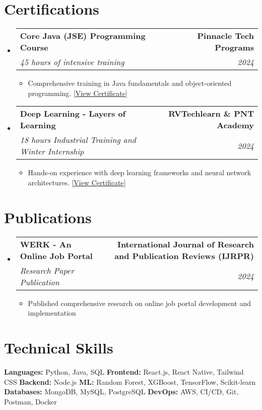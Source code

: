 \documentclass[letterpaper,11pt]{article}
\makeatletter
\newcommand{\resumeItem}[1]{
  \item\small{
    {#1 \vspace{-2pt}}
  }
}
\newcommand{\resumeSubheading}[4]{
  \vspace{-2pt}\item
  \begin{tabular*}{1.0\textwidth}[t]{l@{\extracolsep{\fill}}r}
    \textbf{#1} & \textbf{\small #2} \\
    \textit{\small#3} & \textit{\small #4} \\
  \end{tabular*}\vspace{-7pt}
}
\newcommand{\resumeSubHeadingListStart}{\begin{itemize}[leftmargin=0.0in, label={}]}
\newcommand{\resumeSubHeadingListEnd}{\end{itemize}}
\newcommand{\resumeItemListStart}{\begin{itemize}}
\newcommand{\resumeItemListEnd}{\end{itemize}\vspace{-5pt}}
\makeatother
\begin{document}
\section{Certifications}
\resumeSubHeadingListStart
  \resumeSubheading
    {Core Java (JSE) Programming Course}{Pinnacle Tech Programs}
    {45 hours of intensive training}{2024}
    \resumeItemListStart
      \resumeItem{Comprehensive training in Java fundamentals and object-oriented programming. [\href{https://drive.google.com/file/d/1Lf2cOTG3Nwv9vOYOVXjcn3a3jWpDPUBj/view?usp=sharing}{\color{blue}View Certificate}]}
    \resumeItemListEnd

  \resumeSubheading
    {Deep Learning - Layers of Learning}{RVTechlearn \& PNT Academy}
    {18 hours Industrial Training and Winter Internship}{2024}
    \resumeItemListStart
      \resumeItem{Hands-on experience with deep learning frameworks and neural network architectures. [\href{https://drive.google.com/file/d/1LZmzLzCd4g8qe_HMNEf_ERyJBaHTfGbe/view?usp=sharing}{\color{blue}View Certificate}]}
    \resumeItemListEnd
\resumeSubHeadingListEnd

\section{Publications}
\resumeSubHeadingListStart
  \resumeSubheading
    {WERK - An Online Job Portal}{International Journal of Research and Publication Reviews (IJRPR)}
    {Research Paper Publication}{2024}
    \resumeItemListStart
      \resumeItem{Published comprehensive research on online job portal development and implementation}
    \resumeItemListEnd
\resumeSubHeadingListEnd

\section{Technical Skills}
\small{
  \textbf{Languages:} Python, Java, SQL \quad
  \textbf{Frontend:} React.js, React Native, Tailwind CSS \quad
  \textbf{Backend:} Node.js \quad
  \textbf{ML:} Random Forest, XGBoost, TensorFlow, Scikit-learn \quad
  \textbf{Databases:} MongoDB, MySQL, PostgreSQL \quad
  \textbf{DevOps:} AWS, CI/CD, Git, Postman, Docker
}
\vspace{-10pt}
\end{document}
